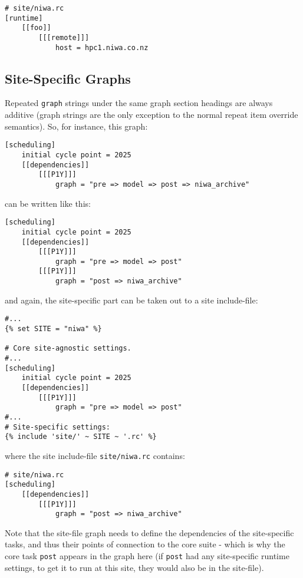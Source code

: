 \begin{lstlisting}
# site/niwa.rc
[runtime]
    [[foo]]
        [[[remote]]]
            host = hpc1.niwa.co.nz
\end{lstlisting}

\subsection{Site-Specific Graphs}

Repeated \lstinline=graph= strings under the same graph section headings are
always additive (graph strings are the only exception to the normal repeat item
override semantics). So, for instance, this graph:

\begin{lstlisting}
[scheduling]
    initial cycle point = 2025
    [[dependencies]]
        [[[P1Y]]]
            graph = "pre => model => post => niwa_archive"
\end{lstlisting}

can be written like this:

\begin{lstlisting}
[scheduling]
    initial cycle point = 2025
    [[dependencies]]
        [[[P1Y]]]
            graph = "pre => model => post"
        [[[P1Y]]]
            graph = "post => niwa_archive"
\end{lstlisting}

and again, the site-specific part can be taken out to a site include-file:

\begin{lstlisting}
#...
{% set SITE = "niwa" %}

# Core site-agnostic settings.
#...
[scheduling]
    initial cycle point = 2025
    [[dependencies]]
        [[[P1Y]]]
            graph = "pre => model => post"
#...
# Site-specific settings:
{% include 'site/' ~ SITE ~ '.rc' %}
\end{lstlisting}

where the site include-file \lstinline=site/niwa.rc= contains:

\begin{lstlisting}
# site/niwa.rc
[scheduling]
    [[dependencies]]
        [[[P1Y]]]
            graph = "post => niwa_archive"
\end{lstlisting}

Note that the site-file graph needs to define the dependencies of the
site-specific tasks, and thus their points of connection to the core suite
- which is why the core task \lstinline=post= appears in the graph here (if
\lstinline=post= had any site-specific runtime settings, to get it to run at
this site, they would also be in the site-file).

